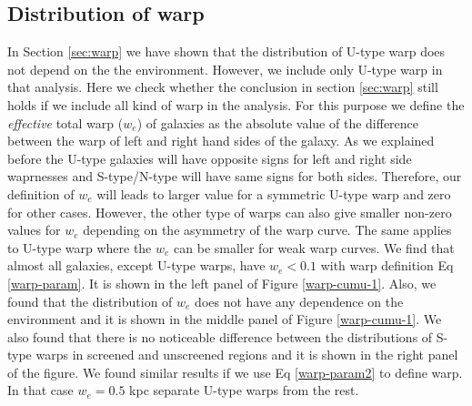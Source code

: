\documentclass[useAMS,usenatbib,twocolumn]{mn2e}
\begin{document}
\subsection{Distribution of warp}
\label{ap:warp-distri}
In Section \ref{sec:warp} we have shown that the distribution of
U-type warp does not depend on the the environment. However, we include
only U-type warp in that analysis. Here we check whether the conclusion in
 section \ref{sec:warp} still holds if we include all kind of
warp in the analysis. For this purpose we define the \textit{effective}
total warp ($w_e$) of galaxies as the absolute value of the difference
between the warp of left and right hand sides of the galaxy. As we
explained before the U-type galaxies will have opposite signs for left and 
right side waprnesses and S-type/N-type will have same signs for both sides.
Therefore, our definition of $w_e$ will leads to larger value for a symmetric
U-type warp and zero for other cases. However, the other type of warps can also
give smaller non-zero values for $w_e$ depending on the asymmetry of the warp
curve. The same applies to U-type warp where the $w_e$ can be smaller for weak
warp curves. We find that almost all galaxies, except U-type warps, have
$w_e < 0.1$ with warp definition Eq \ref{warp-param}. It is shown in the
left panel of Figure \ref{warp-cumu-1}. Also, we found that the distribution of
$w_e$ does not have any dependence on the environment and it is shown in the
middle panel of Figure \ref{warp-cumu-1}. We also found that there is no 
noticeable difference between the distributions of S-type warps in screened and
unscreened regions and it is shown in the right panel of the figure. We found
similar results if we use Eq \ref{warp-param2} to define
warp. In that case $w_e = 0.5$ kpc separate U-type warps from the rest. 
\end{document}
